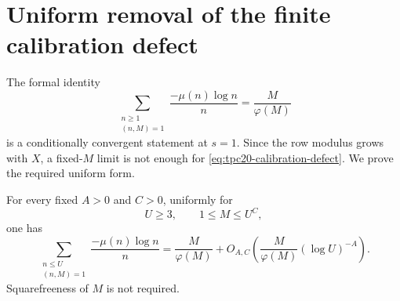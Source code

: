 \section{Uniform removal of the finite calibration defect}
\label{sec:tpc20-uniform-calibration}

The formal identity
\[
 \sum_{\substack{n\ge1\\(n,M)=1}}
 \frac{-\mu(n)\log n}{n}
 =\frac{M}{\varphi(M)}
\]
is a conditionally convergent statement at \(s=1\).  Since the row
modulus grows with \(X\), a fixed-\(M\) limit is not enough for
\eqref{eq:tpc20-calibration-defect}.  We prove the required uniform
form.

\begin{theorem}
\label{thm:tpc20-uniform-calibration}
For every fixed \(A>0\) and \(C>0\), uniformly for
\begin{equation}
 U\ge3,\qquad 1\le M\le U^C,
 \label{eq:tpc20-calibration-range}
\end{equation}
one has
\begin{equation}
 \boxed{
 \sum_{\substack{n\le U\\(n,M)=1}}
 \frac{-\mu(n)\log n}{n}
 =\frac{M}{\varphi(M)}
 +O_{A,C}\!\left(
 \frac{M}{\varphi(M)}(\log U)^{-A}\right).}
 \label{eq:tpc20-uniform-calibration}
\end{equation}
Squarefreeness of \(M\) is not required.
\end{theorem}

